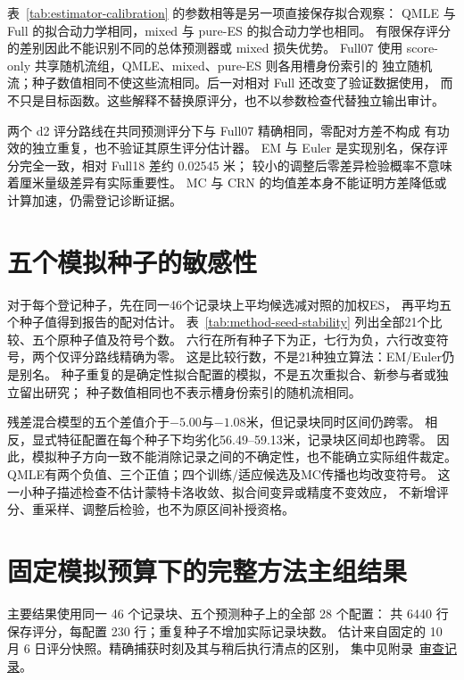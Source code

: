 表~\ref{tab:estimator-calibration} 的参数相等是另一项直接保存拟合观察：
QMLE 与 Full 的拟合动力学相同，mixed 与 pure-ES 的拟合动力学也相同。
有限保存评分的差别因此不能识别不同的总体预测器或 mixed 损失优势。
Full07 使用 score-only 共享随机流组，QMLE、mixed、pure-ES 则各用槽身份索引的
独立随机流；种子数值相同不使这些流相同。后一对相对 Full 还改变了验证数据使用，
而不只是目标函数。这些解释不替换原评分，也不以参数检查代替独立输出审计。

两个 d2 评分路线在共同预测评分下与 Full07 精确相同，零配对方差不构成
有功效的独立重复，也不验证其原生评分估计器。
EM 与 Euler 是实现别名，保存评分完全一致，相对 Full18 差约 0.02545 米；
较小的调整后零差异检验概率不意味着厘米量级差异有实际重要性。
MC 与 CRN 的均值差本身不能证明方差降低或计算加速，仍需登记诊断证据。


\section{五个模拟种子的敏感性}
\label{sec:method-seed-stability}\hypertarget{sec:method-seed-stability}{}
对于每个登记种子，先在同一46个记录块上平均候选减对照的加权ES，
再平均五个种子值得到报告的配对估计。
表~\ref{tab:method-seed-stability} 列出全部21个比较、五个原种子值及符号个数。
六行在所有种子下为正，七行为负，六行改变符号，两个仅评分路线精确为零。
这是比较行数，不是21种独立算法：EM/Euler仍是别名。
种子重复的是确定性拟合配置的模拟，不是五次重拟合、新参与者或独立留出研究；
种子数值相同也不表示槽身份索引的随机流相同。

残差混合模型的五个差值介于$-5.00$与$-1.08$米，但记录块同时区间仍跨零。
相反，显式特征配置在每个种子下均劣化56.49--59.13米，记录块区间却也跨零。
因此，模拟种子方向一致不能消除记录之间的不确定性，也不能确立实际组件裁定。
QMLE有两个负值、三个正值；四个训练/适应候选及MC传播也均改变符号。
这一小种子描述检查不估计蒙特卡洛收敛、拟合间变异或精度不变效应，
不新增评分、重采样、调整后检验，也不为原区间补授资格。


\section{固定模拟预算下的完整方法主组结果}
\label{sec:preliminary-methods}\hypertarget{sec:preliminary-methods}{}
主要结果使用同一 46 个记录块、五个预测种子上的全部 28 个配置：
共 6440 行保存评分，每配置 230 行；重复种子不增加实际记录块数。
估计来自固定的 10 月 6 日评分快照。精确捕获时刻及其与稍后执行清点的区别，
集中见附录~\href{audit-notes.pdf\#sec:score-execution-snapshots}{审查记录}。

